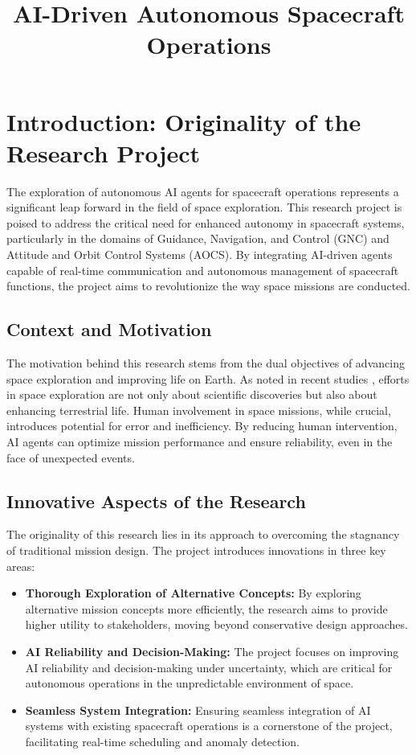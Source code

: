 \documentclass[a4paper,12pt]{article}
\title{AI-Driven Autonomous Spacecraft Operations}
\author{}
\date{}
\begin{document}
\maketitle
\tableofcontents
\newpage

\section{Introduction: Originality of the Research Project}

The exploration of autonomous AI agents for spacecraft operations represents a significant leap forward in the field of space exploration. This research project is poised to address the critical need for enhanced autonomy in spacecraft systems, particularly in the domains of Guidance, Navigation, and Control (GNC) and Attitude and Orbit Control Systems (AOCS). By integrating AI-driven agents capable of real-time communication and autonomous management of spacecraft functions, the project aims to revolutionize the way space missions are conducted.

\subsection{Context and Motivation}

The motivation behind this research stems from the dual objectives of advancing space exploration and improving life on Earth. As noted in recent studies \cite{ApplSci2022}, efforts in space exploration are not only about scientific discoveries but also about enhancing terrestrial life. Human involvement in space missions, while crucial, introduces potential for error and inefficiency. By reducing human intervention, AI agents can optimize mission performance and ensure reliability, even in the face of unexpected events.

\subsection{Innovative Aspects of the Research}

The originality of this research lies in its approach to overcoming the stagnancy of traditional mission design. The project introduces innovations in three key areas:

\begin{itemize}
    \item \textbf{Thorough Exploration of Alternative Concepts:} By exploring alternative mission concepts more efficiently, the research aims to provide higher utility to stakeholders, moving beyond conservative design approaches.
    \item \textbf{AI Reliability and Decision-Making:} The project focuses on improving AI reliability and decision-making under uncertainty, which are critical for autonomous operations in the unpredictable environment of space.
    \item \textbf{Seamless System Integration:} Ensuring seamless integration of AI systems with existing spacecraft operations is a cornerstone of the project, facilitating real-time scheduling and anomaly detection.
\end{itemize}
\end{document}
